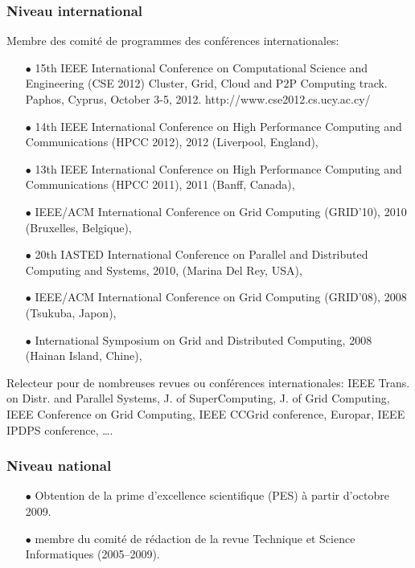 \documentclass[11pt]{article}
\begin{document}
\subsubsection{Niveau international}
Membre des comité de programmes des conférences internationales:\\[-3mm]
\begin{itemize}
\item[$\bullet$]
15th IEEE International Conference on Computational Science and Engineering (CSE 2012) 
Cluster, Grid, Cloud and P2P Computing track. Paphos, Cyprus, October 3-5, 2012. 
http://www.cse2012.cs.ucy.ac.cy/

\item[$\bullet$] 
14th IEEE International Conference on High Performance Computing and Communications (HPCC 2012), 
2012 (Liverpool, England),
\item[$\bullet$] 
13th IEEE International Conference on High Performance Computing and Communications (HPCC 2011), 
2011 (Banff, Canada),
\item[$\bullet$] 
IEEE/ACM International Conference on Grid Computing (GRID'10), 2010 (Bruxelles, Belgique),
\item[$\bullet$] 
20th IASTED International Conference on Parallel and Distributed Computing and Systems, 2010, (Marina Del Rey, USA),
\item[$\bullet$] 
IEEE/ACM International Conference on Grid Computing (GRID'08), 2008 (Tsukuba, Japon), 
\item [$\bullet$]
International Symposium on Grid and Distributed Computing, 2008 (Hainan Island, Chine),\\
\end{itemize}

Relecteur pour de nombreuses revues ou conférences internationales: IEEE Trans. on Distr. and Parallel Systems, 
J. of SuperComputing, J. of Grid Computing, IEEE Conference on Grid Computing, IEEE CCGrid conference, Europar,
IEEE IPDPS conference, \ldots.


\subsubsection{Niveau national}
\begin{itemize}

\item[$\bullet$] Obtention de la prime d'excellence scientifique (PES) à partir d'octobre 2009.\\

\item [$\bullet$]
membre du comité de rédaction de la revue Technique et Science Informatiques (2005--2009).\\
\end{itemize}
\end{document}
